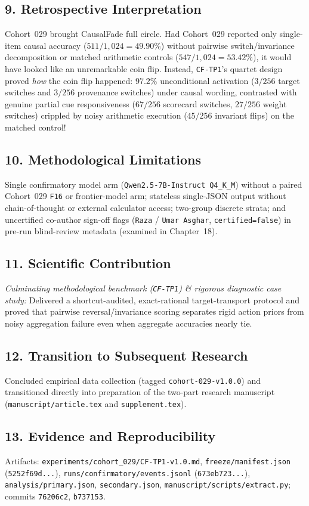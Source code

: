 \subsection*{9. Retrospective Interpretation}
Cohort~029 brought CausalFade full circle. Had Cohort~029 reported only single-item causal accuracy ($511/1{,}024 = 49.90\%$) without pairwise switch/invariance decomposition or matched arithmetic controls ($547/1{,}024 = 53.42\%$), it would have looked like an unremarkable coin flip. Instead, \texttt{CF-TP1}'s quartet design proved \emph{how} the coin flip happened: $97.2\%$ unconditional activation ($3/256$ target switches and $3/256$ provenance switches) under causal wording, contrasted with genuine partial cue responsiveness ($67/256$ scorecard switches, $27/256$ weight switches) crippled by noisy arithmetic execution ($45/256$ invariant flips) on the matched control!

\subsection*{10. Methodological Limitations}
Single confirmatory model arm (\texttt{Qwen2.5-7B-Instruct Q4\_K\_M}) without a paired Cohort~029 \texttt{F16} or frontier-model arm; stateless single-JSON output without chain-of-thought or external calculator access; two-group discrete strata; and uncertified co-author sign-off flags (\texttt{Raza} / \texttt{Umar Asghar}, \texttt{certified=false}) in pre-run blind-review metadata (examined in Chapter~18).

\subsection*{11. Scientific Contribution}
\emph{Culminating methodological benchmark (\texttt{CF-TP1}) \& rigorous diagnostic case study:} Delivered a shortcut-audited, exact-rational target-transport protocol and proved that pairwise reversal/invariance scoring separates rigid action priors from noisy aggregation failure even when aggregate accuracies nearly tie.

\subsection*{12. Transition to Subsequent Research}
Concluded empirical data collection (tagged \texttt{cohort-029-v1.0.0}) and transitioned directly into preparation of the two-part research manuscript (\texttt{manuscript/article.tex} and \texttt{supplement.tex}).

\subsection*{13. Evidence and Reproducibility}
Artifacts: \texttt{experiments/cohort\_029/CF-TP1-v1.0.md}, \texttt{freeze/manifest.json} (\texttt{5252f69d...}), \texttt{runs/confirmatory/events.jsonl} (\texttt{673eb723...}), \texttt{analysis/primary.json}, \texttt{secondary.json}, \texttt{manuscript/scripts/extract.py}; commits \texttt{76206c2}, \texttt{b737153}.
